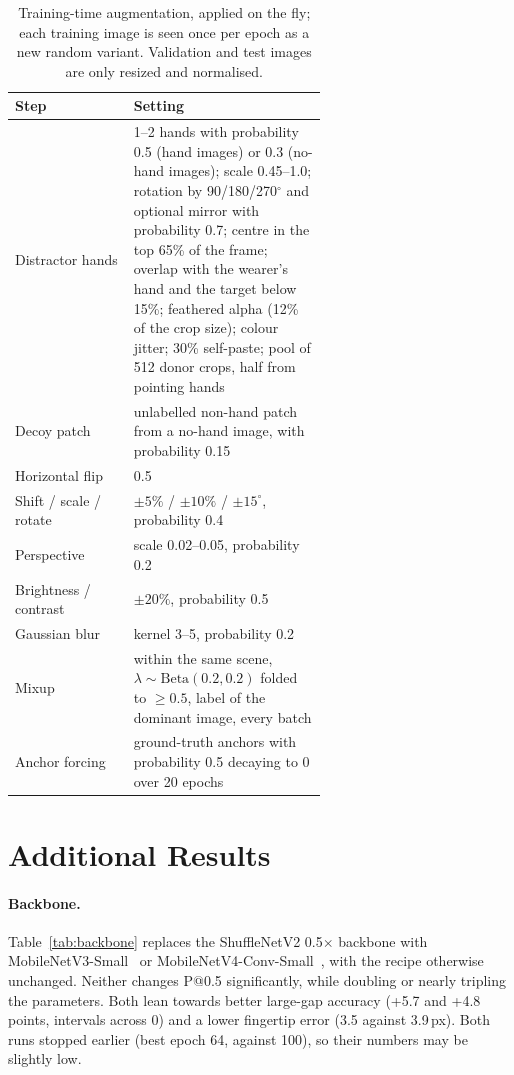 \begin{table}[h]
  \caption{Training-time augmentation, applied on the fly; each training image is seen once per epoch as a new random variant. Validation and test images are only resized and normalised.}
  \label{tab:aug}
  \footnotesize
  \begin{tabular}{lp{0.62\linewidth}}
    \toprule
    Step & Setting \\
    \midrule
    Distractor hands & 1--2 hands with probability 0.5 (hand images) or 0.3 (no-hand images); scale 0.45--1.0; rotation by 90/180/270$^\circ$ and optional mirror with probability 0.7; centre in the top 65\% of the frame; overlap with the wearer's hand and the target below 15\%; feathered alpha (12\% of the crop size); colour jitter; 30\% self-paste; pool of 512 donor crops, half from pointing hands \\
    Decoy patch & unlabelled non-hand patch from a no-hand image, with probability 0.15 \\
    Horizontal flip & 0.5 \\
    Shift / scale / rotate & ${\pm}5\%$ / ${\pm}10\%$ / ${\pm}15^\circ$, probability 0.4 \\
    Perspective & scale 0.02--0.05, probability 0.2 \\
    Brightness / contrast & ${\pm}20\%$, probability 0.5 \\
    Gaussian blur & kernel 3--5, probability 0.2 \\
    Mixup & within the same scene, $\lambda\sim\mathrm{Beta}(0.2,0.2)$ folded to ${\geq}0.5$, label of the dominant image, every batch \\
    Anchor forcing & ground-truth anchors with probability 0.5 decaying to 0 over 20 epochs \\
    \bottomrule
  \end{tabular}
\end{table}

\section{Additional Results}\label{app:extra}

\paragraph{Backbone.} Table~\ref{tab:backbone} replaces the ShuffleNetV2 0.5$\times$ backbone with MobileNetV3-Small~\cite{howard2019mobilenetv3} or MobileNetV4-Conv-Small~\cite{qin2024mobilenetv4}, with the recipe otherwise unchanged. Neither changes P@0.5 significantly, while doubling or nearly tripling the parameters. Both lean towards better large-gap accuracy (+5.7 and +4.8 points, intervals across 0) and a lower fingertip error (3.5 against 3.9\,px). Both runs stopped earlier (best epoch 64, against 100), so their numbers may be slightly low.

